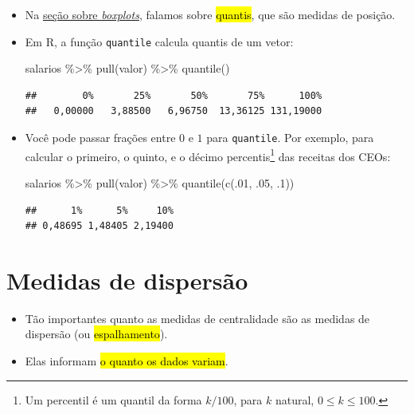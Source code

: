 \documentclass[
  11pt]{report}
\newenvironment{Shaded}{\begin{snugshade}}{\end{snugshade}}
\newcommand{\DecValTok}[1]{\textcolor[rgb]{0.00,0.00,0.81}{#1}}
\newcommand{\FunctionTok}[1]{\textcolor[rgb]{0.00,0.00,0.00}{#1}}
\newcommand{\NormalTok}[1]{#1}
\newcommand{\SpecialCharTok}[1]{\textcolor[rgb]{0.00,0.00,0.00}{#1}}
\renewenvironment{Shaded}{
    \begin{mdframed}[%
      roundcorner=2pt,%
      innerleftmargin=5pt,%
      innerrightmargin=5pt,%
      topline=true,%
      leftline=true,%
      rightline=true,%
      bottomline=true,%
      linewidth=0.5pt,%
      linecolor=black!20,%
      backgroundcolor=black!2,%
      skipabove=2ex,%
      skipbelow=2.5ex%
    ]%
  }
  {
    \end{mdframed}
  }
\begin{document}
\begin{itemize}
\item
  Na \protect\hyperlink{mediana}{seção sobre \emph{boxplots}}, falamos sobre {\hl{quantis}}, que são medidas de posição.
\item
  Em R, a função \texttt{quantile} calcula quantis de um vetor:

\begin{Shaded}
\begin{Highlighting}[]
\NormalTok{salarios }\SpecialCharTok{\%\textgreater{}\%} 
  \FunctionTok{pull}\NormalTok{(valor) }\SpecialCharTok{\%\textgreater{}\%} 
  \FunctionTok{quantile}\NormalTok{()}
\end{Highlighting}
\end{Shaded}

\begin{verbatim}
##        0%       25%       50%       75%      100% 
##   0,00000   3,88500   6,96750  13,36125 131,19000
\end{verbatim}
\item
  Você pode passar frações entre $0$ e $1$ para \texttt{quantile}. Por exemplo, para calcular o primeiro, o quinto, e o décimo percentis\footnote{Um percentil é um quantil da forma $k/100$, para $k$ natural, $0 \leq k \leq 100$.} das receitas dos CEOs:

\begin{Shaded}
\begin{Highlighting}[]
\NormalTok{salarios }\SpecialCharTok{\%\textgreater{}\%} 
  \FunctionTok{pull}\NormalTok{(valor) }\SpecialCharTok{\%\textgreater{}\%} 
  \FunctionTok{quantile}\NormalTok{(}\FunctionTok{c}\NormalTok{(.}\DecValTok{01}\NormalTok{, .}\DecValTok{05}\NormalTok{, .}\DecValTok{1}\NormalTok{))}
\end{Highlighting}
\end{Shaded}

\begin{verbatim}
##      1%      5%     10% 
## 0,48695 1,48405 2,19400
\end{verbatim}
\end{itemize}

\hypertarget{medidas-de-dispersuxe3o}{%
\section{Medidas de dispersão}\label{medidas-de-dispersuxe3o}}

\begin{itemize}
\item
  Tão importantes quanto as medidas de centralidade são as medidas de dispersão (ou {\hl{espalhamento}}).
\item
  Elas informam {\hl{o quanto os dados variam}}.
\end{itemize}
\end{document}
